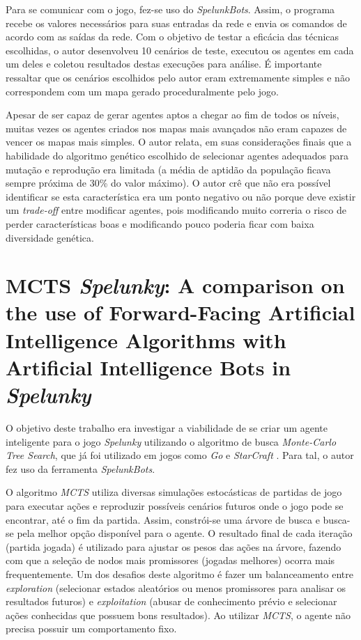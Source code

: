Para se comunicar com o jogo, fez-se uso do \textit{SpelunkBots}. Assim, o
programa recebe os valores necessários para suas entradas da rede e envia os
comandos de acordo com as saídas da rede. Com o objetivo de testar a eficácia
das técnicas escolhidas, o autor desenvolveu 10 cenários de teste, executou os
agentes em cada um deles e coletou resultados destas execuções para análise. É
importante ressaltar que os cenários escolhidos pelo autor eram extremamente
simples e não correspondem com um mapa gerado proceduralmente pelo jogo.

Apesar de ser capaz de gerar agentes aptos a chegar ao fim de todos os níveis,
muitas vezes os agentes criados nos mapas mais avançados não eram capazes de
vencer os mapas mais simples. O autor relata, em suas considerações finais que a
habilidade do algoritmo genético escolhido de selecionar agentes adequados para
mutação e reprodução era limitada (a média de aptidão da população ficava sempre
próxima de 30\% do valor máximo). O autor crê que não era possível identificar
se esta característica era um ponto negativo ou não porque deve existir um
\textit{trade-off} entre modificar agentes, pois modificando muito correria o
risco de perder características boas e modificando pouco poderia ficar com baixa
diversidade genética. 


\section{MCTS \textit{Spelunky}: A comparison on the use of Forward-Facing
Artificial Intelligence Algorithms with Artificial Intelligence Bots in
\textit{Spelunky}}
O objetivo deste trabalho era investigar a viabilidade de se criar um agente
inteligente para o jogo \textit{Spelunky} utilizando o algoritmo de busca
\textit{Monte-Carlo Tree Search}, que já foi utilizado em jogos como \textit{Go}
e \textit{StarCraft} \cite{spelunky_mcts}. Para tal, o autor fez uso da
ferramenta \textit{SpelunkBots}.

O algoritmo \textit{MCTS} utiliza diversas simulações estocásticas de partidas
de jogo para executar ações e reproduzir possíveis cenários futuros onde o jogo
pode se encontrar, até o fim da partida. Assim, constrói-se uma árvore de busca
e busca-se pela melhor opção disponível para o agente. O resultado final de cada
iteração (partida jogada) é utilizado para ajustar os pesos das ações na árvore,
fazendo com que a seleção de nodos mais promissores (jogadas melhores) ocorra
mais frequentemente. Um dos desafios deste algoritmo é fazer um balanceamento
entre \textit{exploration} (selecionar estados aleatórios ou menos promissores
para analisar os resultados futuros) e \textit{exploitation} (abusar de
conhecimento prévio e selecionar ações conhecidas que possuem bons resultados).
Ao utilizar \textit{MCTS}, o agente não precisa possuir um comportamento fixo.

